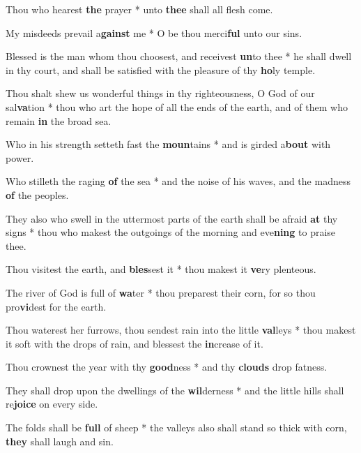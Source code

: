 \begin{multicols}{2}
	Thou who hearest \textbf{the} prayer * unto \textbf{thee} shall all flesh come.
	
	My misdeeds prevail a\textbf{gainst} me * O be thou merci\textbf{ful} unto our sins.
	
	Blessed is the man whom thou choosest, and receivest \textbf{un}to thee * he shall dwell in thy court, and shall be satisfied with the pleasure of thy \textbf{ho}ly temple.
	
	Thou shalt shew us wonderful things in thy righteousness, O God of our sal\textbf{va}tion * thou who art the hope of all the ends of the earth, and of them who remain \textbf{in} the broad sea.
	
	Who in his strength setteth fast the \textbf{moun}tains * and is girded a\textbf{bout} with power.
	
	Who stilleth the raging \textbf{of} the sea * and the noise of his waves, and the madness \textbf{of} the peoples.
	
	They also who swell in the uttermost parts of the earth shall be afraid \textbf{at} thy signs * thou who makest the outgoings of the morning and eve\textbf{ning} to praise thee.
	
	Thou visitest the earth, and \textbf{bles}sest it * thou makest it \textbf{ve}ry plenteous.
	
	The river of God is full of \textbf{wa}ter * thou preparest their corn, for so thou pro\textbf{vi}dest for the earth.
	
	Thou waterest her furrows, thou sendest rain into the little \textbf{val}leys * thou makest it soft with the drops of rain, and blessest the \textbf{in}crease of it.
	
	Thou crownest the year with thy \textbf{good}ness * and thy \textbf{clouds} drop fatness.
	
	They shall drop upon the dwellings of the \textbf{wil}derness * and the little hills shall re\textbf{joice} on every side.
	
	The folds shall be \textbf{full} of sheep * the valleys also shall stand so thick with corn, \textbf{they} shall laugh and sin.
\end{multicols}